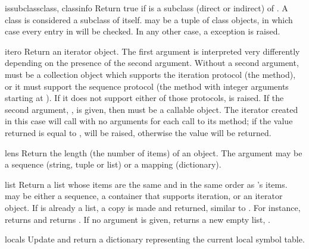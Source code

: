 \begin{funcdesc}{issubclass}{class, classinfo}
  Return true if  is a subclass (direct or indirect) of
  .  A class is considered a subclass of itself.
   may be a tuple of class objects, in which case every
  entry in  will be checked. In any other case, a
   exception is raised.
\end{funcdesc}

\begin{funcdesc}{iter}{o}
  Return an iterator object.  The first argument is interpreted very
  differently depending on the presence of the second argument.
  Without a second argument,  must be a collection object which
  supports the iteration protocol (the  method), or
  it must support the sequence protocol (the 
  method with integer arguments starting at ).  If it does not
  support either of those protocols,  is raised.
  If the second argument, , is given, then  must
  be a callable object.  The iterator created in this case will call
   with no arguments for each call to its 
  method; if the value returned is equal to ,
   will be raised, otherwise the value will
  be returned.
\end{funcdesc}

\begin{funcdesc}{len}{s}
  Return the length (the number of items) of an object.  The argument
  may be a sequence (string, tuple or list) or a mapping (dictionary).
\end{funcdesc}

\begin{funcdesc}{list}{}
  Return a list whose items are the same and in the same order as
  's items.   may be either a sequence, a
  container that supports iteration, or an iterator object.  If
   is already a list, a copy is made and returned,
  similar to .  For instance,
   returns \code{['a', 'b', 'c']} and  returns \code{[1, 2, 3]}.  If no argument is given,
  returns a new empty list, \code{[]}.
\end{funcdesc}

\begin{funcdesc}{locals}{}
  Update and return a dictionary representing the current local symbol table.
\end{funcdesc}

